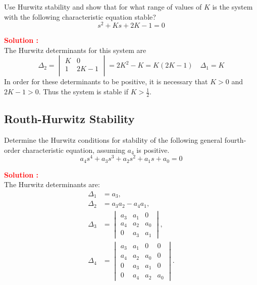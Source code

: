 \documentclass[12pt]{article}
\begin{document}
Use Hurwitz stability and show that for what range of values of \(K\) is the system with the following characteristic equation stable?
\begin{equation}
    s^2 + Ks +2K-1 = 0
\end{equation}

\textbf{\textcolor{red}{Solution :}} \\
The Hurwitz determinants for this system are
\begin{equation}
    \Delta_2 = 
\begin{vmatrix}
K & 0 \\
1 & 2K-1 \\
\end{vmatrix} = 2K^2-K = K(2K-1) \quad \Delta_1 = K
\end{equation}
In order for these determinants to be positive, it is necessary that \(K>0\) and \(2K-1>0\). Thus the system is stable if \(K>\frac{1}{2}\).

\clearpage
\subsection{Routh-Hurwitz Stability}

Determine the Hurwitz conditions for stability of the following general fourth-order characteristic equation, assuming \(a_4\) is positive.
\begin{equation}
    a_4s^4 + a_3s^3 + a_2 s^2 + a_1 s + a_0 = 0
\end{equation}

\textbf{\textcolor{red}{Solution :}} \\

The Hurwitz determinants are:
\begin{align*}
\Delta_1 &= a_3, \\
\Delta_2 &= a_3a_2 - a_4a_1, \\
\Delta_3 &= \begin{vmatrix} a_3 & a_1 & 0 \\ a_4 & a_2 & a_0 \\ 0 & a_3 & a_1 \end{vmatrix}, \\
\Delta_4 &= \begin{vmatrix} a_3 & a_1 & 0 & 0 \\ a_4 & a_2 & a_0 & 0 \\ 0 & a_3 & a_1 & 0 \\ 0 & a_4 & a_2 & a_0 \end{vmatrix}.
\end{align*}
\end{document}
